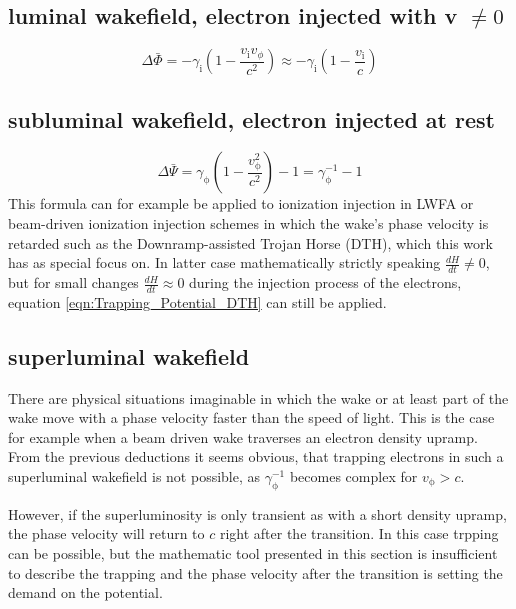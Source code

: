 \subsection*{luminal wakefield, electron injected  with v $\neq 0$}
\begin{equation}
\Delta \bar{\Phi}= -\gamma_\mathrm{i}(1-\frac{v_\mathrm{i}v_\phi}{c^2})\approx -\gamma_\mathrm{i}(1-\frac{v_\mathrm{i}}{c})
\end{equation}
\subsection*{subluminal wakefield, electron injected at rest}

\begin{equation}
\label{eqn:Trapping_Potential_DTH}
\Delta \bar{\Psi}=\gamma_\mathrm{\phi}(1-\frac{v_\mathrm{\phi}^2}{c^2})-1=\gamma_\mathrm{\phi}^{-1}-1
\end{equation}
This formula can for example be applied to ionization injection in LWFA\cite{PakPRL2012} or beam-driven ionization injection schemes in which the wake's phase velocity is retarded such as the Downramp-assisted Trojan Horse (DTH)\cite{DTH}, which this work has as special focus on. In latter case mathematically strictly speaking $\frac{d H}{dt}\neq0 $, but for small changes $\frac{dH}{dt}\approx 0$ during the injection process of the electrons, equation \ref{eqn:Trapping_Potential_DTH} can still be applied.

\subsection*{superluminal wakefield}
There are physical situations imaginable in which the wake or at least part of the wake move with a phase velocity faster than the speed of light. This is the case for example when a beam driven wake traverses an electron density upramp.
From the previous deductions it seems obvious, that trapping electrons in such a superluminal wakefield is not possible, as $\gamma_\mathrm{\phi}^{-1}$ becomes complex for $v_\mathrm{\phi}>c$.

However, if the superluminosity is only transient as with a short density upramp, the phase velocity will return to $c$ right after the transition. In this case trpping can be possible, but the mathematic tool presented in this section is insufficient to describe the trapping and the phase velocity after the transition is setting the demand on the potential.
